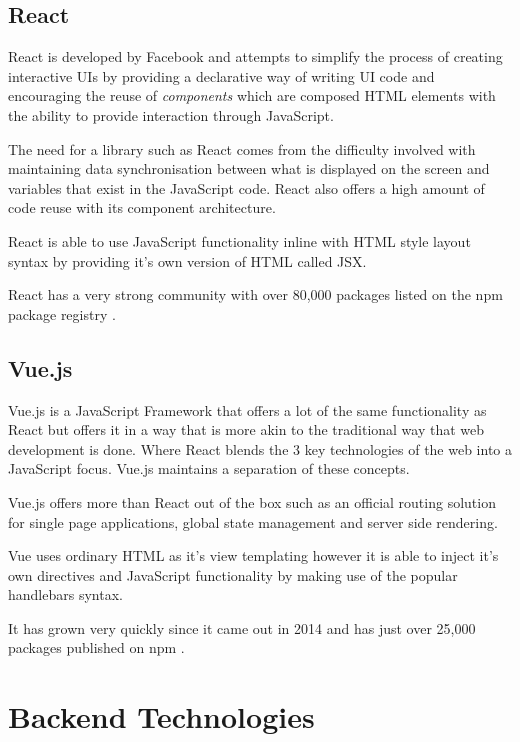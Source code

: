 \subsection{React}

React is developed by Facebook and attempts to simplify the process of creating interactive UIs by providing a declarative way of writing UI code and encouraging the reuse of \textit{components} which are composed HTML elements with the ability to provide interaction through JavaScript.

The need for a library such as React comes from the difficulty involved with maintaining data synchronisation between what is displayed on the screen and variables that exist in the JavaScript code. React also offers a high amount of code reuse with its component architecture. 

React is able to use JavaScript functionality inline with HTML style layout syntax by providing it's own version of HTML called JSX.

React has a very strong community with over 80,000 packages listed on the npm package registry \cite{npm-search-react}.

\subsection{Vue.js}

Vue.js is a JavaScript Framework that offers a lot of the same functionality as React but offers it in a way that is more akin to the traditional way that web development is done. Where React blends the 3 key technologies of the web into a JavaScript focus. Vue.js maintains a separation of these concepts.

Vue.js offers more than React out of the box such as an official routing solution for single page applications, global state management and server side rendering.

Vue uses ordinary HTML as it's view templating however it is able to inject it's own directives and JavaScript functionality by making use of the popular handlebars syntax.

It has grown very quickly since it came out in 2014 and has just over 25,000 packages published on npm \cite{npm-search-vue}.

\section{Backend Technologies} \label{lit-backend}

